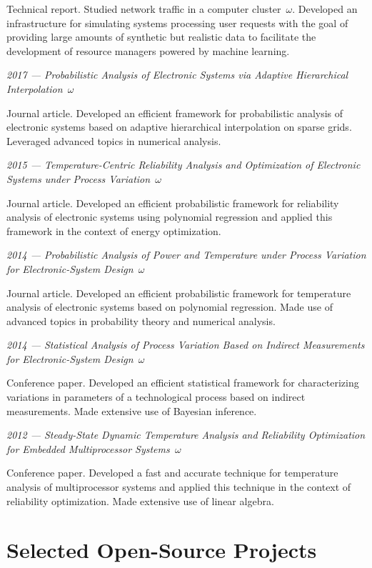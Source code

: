\documentclass[journal]{IEEEtran}
\begin{document}
Technical report. Studied network traffic in a computer cluster~$\omega$.
Developed an infrastructure for simulating systems processing user requests with
the goal of providing large amounts of synthetic but realistic data to
facilitate the development of resource managers powered by machine learning.

\emph{2017 --- Probabilistic Analysis of Electronic Systems via Adaptive
Hierarchical Interpolation~$\omega$}

Journal article. Developed an efficient framework for probabilistic analysis of
electronic systems based on adaptive hierarchical interpolation on sparse grids.
Leveraged advanced topics in numerical analysis.

\emph{2015 --- Temperature-Centric Reliability Analysis and Optimization of
Electronic Systems under Process Variation~$\omega$}

Journal article. Developed an efficient probabilistic framework for reliability
analysis of electronic systems using polynomial regression and applied this
framework in the context of energy optimization.

\emph{2014 --- Probabilistic Analysis of Power and Temperature under Process
Variation for Electronic-System Design~$\omega$}

Journal article. Developed an efficient probabilistic framework for temperature
analysis of electronic systems based on polynomial regression. Made use of
advanced topics in probability theory and numerical analysis.

\emph{2014 --- Statistical Analysis of Process Variation Based on Indirect
Measurements for Electronic-System Design~$\omega$}

Conference paper. Developed an efficient statistical framework for
characterizing variations in parameters of a technological process based on
indirect measurements. Made extensive use of Bayesian inference.

\emph{2012 --- Steady-State Dynamic Temperature Analysis and Reliability
Optimization for Embedded Multiprocessor Systems~$\omega$}

Conference paper. Developed a fast and accurate technique for temperature
analysis of multiprocessor systems and applied this technique in the context of
reliability optimization. Made extensive use of linear algebra.

\section{Selected Open-Source Projects}
\end{document}
